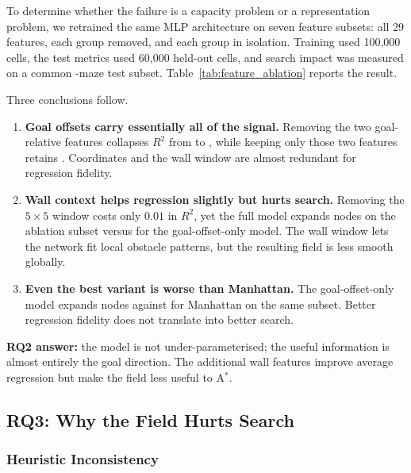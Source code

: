 To determine whether the failure is a capacity problem or a representation problem, we
retrained the same MLP architecture on seven feature subsets: all 29 features, each
group removed, and each group in isolation. Training used 100{,}000 cells, the test
metrics used 60{,}000 held-out cells, and search impact was measured on a common
\PfiveAblMazes{}-maze test subset. Table~\ref{tab:feature_ablation} reports the result.

\begin{table}[H]
\centering

\end{table}

Three conclusions follow.
\begin{enumerate}
  \item \textbf{Goal offsets carry essentially all of the signal.} Removing the two
  goal-relative features collapses $R^2$ from \PfiveAblAllRtwo{} to \PfiveAblNoGoalRtwo{},
  while keeping only those two features retains \PfiveAblGoalOnlyRtwo{}. Coordinates and
  the wall window are almost redundant for regression fidelity.
  \item \textbf{Wall context helps regression slightly but hurts search.} Removing the
  $5\times5$ window costs only $0.01$ in $R^2$, yet the full model expands
  \PfiveAblAllNodes{} nodes on the ablation subset versus \PfiveAblGoalOnlyNodes{} for
  the goal-offset-only model. The wall window lets the network fit local obstacle
  patterns, but the resulting field is less smooth globally.
  \item \textbf{Even the best variant is worse than Manhattan.} The goal-offset-only
  model expands \PfiveAblGoalOnlyNodes{} nodes against
  \PfiveAblManhattanNodes{} for Manhattan on the same subset. Better regression fidelity
  does not translate into better search.
\end{enumerate}

\textbf{RQ2 answer:} the model is not under-parameterised; the useful information is
almost entirely the goal direction. The additional wall features improve average
regression but make the field less useful to A$^\ast$.

\subsection{RQ3: Why the Field Hurts Search}

\subsubsection{Heuristic Inconsistency}

